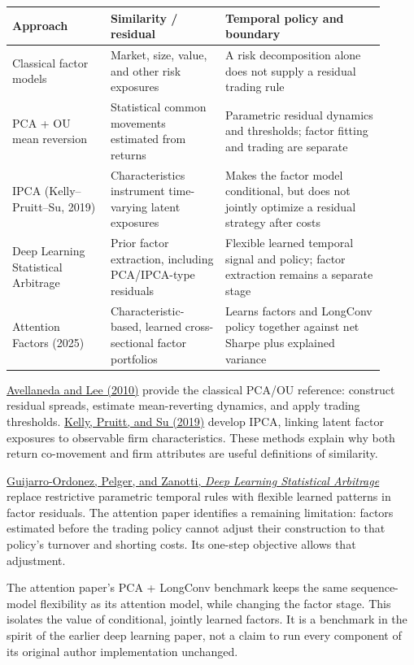 \documentclass[11pt]{article}
\begin{document}
\begin{center}
\small
\begin{tabular}{p{0.24\linewidth}p{0.28\linewidth}p{0.39\linewidth}}
\toprule
Approach & Similarity / residual & Temporal policy and boundary\\
\midrule
Classical factor models
& Market, size, value, and other risk exposures
& A risk decomposition alone does not supply a residual trading rule\\
PCA + OU mean reversion
& Statistical common movements estimated from returns
& Parametric residual dynamics and thresholds; factor fitting and trading are separate\\
IPCA (Kelly--Pruitt--Su, 2019)
& Characteristics instrument time-varying latent exposures
& Makes the factor model conditional, but does not jointly optimize a residual strategy after costs\\
Deep Learning Statistical Arbitrage
& Prior factor extraction, including PCA/IPCA-type residuals
& Flexible learned temporal signal and policy; factor extraction remains a separate stage\\
Attention Factors (2025)
& Characteristic-based, learned cross-sectional factor portfolios
& Learns factors and LongConv policy together against net Sharpe plus explained variance\\
\bottomrule
\end{tabular}
\end{center}

\href{https://doi.org/10.1080/14697680903124632}{Avellaneda and Lee (2010)}
provide the classical PCA/OU reference: construct residual spreads,
estimate mean-reverting dynamics, and apply trading thresholds.
\href{https://doi.org/10.1016/j.jfineco.2019.05.001}{Kelly, Pruitt, and Su (2019)}
develop IPCA, linking latent factor exposures to observable firm
characteristics. These methods explain why both return co-movement
and firm attributes are useful definitions of similarity.

\href{https://doi.org/10.2139/ssrn.3862004}{Guijarro-Ordonez, Pelger, and Zanotti,
\emph{Deep Learning Statistical Arbitrage}} replace restrictive
parametric temporal rules with flexible learned patterns in factor
residuals. The attention paper identifies a remaining limitation:
factors estimated before the trading policy cannot adjust their
construction to that policy's turnover and shorting costs. Its
one-step objective allows that adjustment.

The attention paper's PCA + LongConv benchmark keeps the same
sequence-model flexibility as its attention model, while changing
the factor stage. This isolates the value of conditional, jointly
learned factors. It is a benchmark in the spirit of the earlier deep
learning paper, not a claim to run every component of its original
author implementation unchanged.
\end{document}
